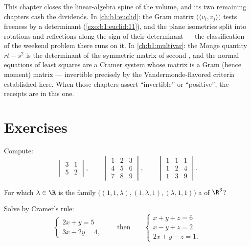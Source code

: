 \begin{remark}
\label{rem:b1:det:perspectives}
This chapter closes the linear-algebra spine of the volume, and
its two remaining chapters cash the dividends. In
\cref{ch:b1:euclid}: the Gram matrix
$\bigl(\langle v_i, v_j\rangle\bigr)$ tests freeness by a
determinant (\cref{exo:b1:euclid:11}), and the plane isometries
split into rotations and reflections along the sign of their
determinant --- the classification of the weekend problem there
runs on it. In \cref{ch:b1:multivar}: the Monge quantity $rt -
s^2$ is the determinant of the symmetric matrix of second
, and the normal equations of least squares are a
Cramer system whose matrix is a Gram (hence moment) matrix ---
invertible precisely by the Vandermonde-flavored criteria
established here. When those chapters assert ``invertible'' or
``positive'', the receipts are in this one.
\end{remark}

\section{Exercises}

\begin{exercise}[$\star$]\label{exo:b1:det:1}
Compute:
\[
\begin{vmatrix} 3 & 1\\ 5 & 2 \end{vmatrix},
\qquad
\begin{vmatrix} 1 & 2 & 3\\ 4 & 5 & 6\\ 7 & 8 & 9\end{vmatrix},
\qquad
\begin{vmatrix} 1 & 1 & 1\\ 1 & 2 & 4\\ 1 & 3 & 9\end{vmatrix}.
\]
\end{exercise}

\begin{exercise}[$\star$]\label{exo:b1:det:2}
For which $\lambda \in \R$ is the family $\bigl((1, 1, \lambda),
(1, \lambda, 1), (\lambda, 1, 1)\bigr)$ a  of $\R^3$?
\end{exercise}

\begin{exercise}[$\star$]\label{exo:b1:det:3}
Solve by Cramer's rule:
\[
\begin{cases}
2x + y = 5\\
3x - 2y = 4 ,
\end{cases}
\qquad\text{then}\qquad
\begin{cases}
x + y + z = 6\\
x - y + z = 2\\
2x + y - z = 1 .
\end{cases}
\]
\end{exercise}


